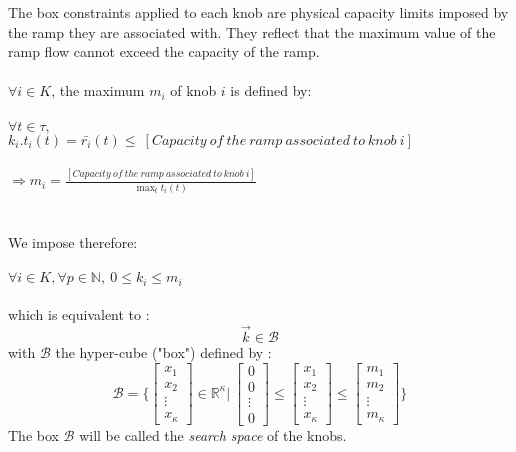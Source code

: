The box constraints applied to each knob are physical capacity limits imposed by the ramp they are associated with. They reflect that the maximum value of the ramp flow cannot exceed the capacity of the ramp.\\
\\
	$\forall i\in{K}$, the maximum $m_{i}$ of knob $i$ is defined by:
	\\
	\\
	$\forall t \in \tau,$\\
	$k_{i}.t_{i}(t)=\bar{r_{i}}(t)\leq\ \scriptstyle{[Capacity\ of\ the\ ramp\ associated\ to\ knob\ i]}$
	\\
	\\
	$\Rightarrow m_{i}=\frac{[Capacity\ of\ the\ ramp\ associated\ to\ knob\ i]}{\max_{t} t_{i}(t)}$\\
	\\
	\\
	We impose therefore: \\
	\\
	$\forall i\in{K},\forall p\in{\mathbb{N}},\ 0\leq k_{i}\leq m_{i}$\\
\\
which is equivalent to :
\begin{equation}
\label{eq:naive}
	\vec{k}\in\mathscr{B}
\end{equation}
with $\mathscr{B}$ the hyper-cube ("box") defined by :\\
\begin{equation*}
	\mathscr{B}=\Bigg\{\begin{bmatrix}x_{1}\\x_{2}\\\vdots\\x_{\kappa}\end{bmatrix}\in\mathds{R}^{\kappa}\Bigg| \ \begin{bmatrix}0\\0\\\vdots\\0\end{bmatrix}\leq\begin{bmatrix}x_{1}\\x_{2}\\\vdots\\x_{\kappa}\end{bmatrix}\leq\begin{bmatrix}m_{1}\\m_{2}\\\vdots\\m_{\kappa}\end{bmatrix}\Bigg\}
\end{equation*}
The box $\mathscr{B}$ will be called the \emph{search space} of the knobs.\\




	